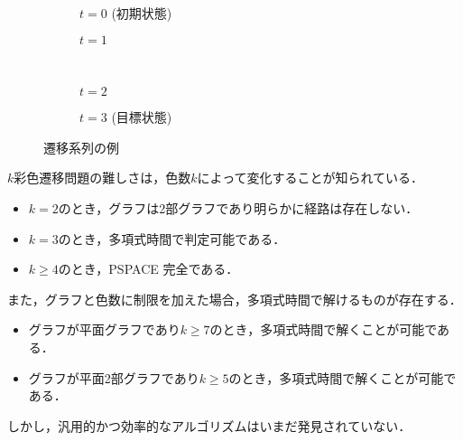 \begin{figure}[htbp]
  \centering
  \begin{subfigure}{0.4\hsize}
    \centering
    
    \caption{$t=0$ (初期状態)}
   \end{subfigure}
   \hspace{1cm}
   \begin{subfigure}{0.4\hsize}
    \centering
    
    \caption{$t=1$}
   \end{subfigure}
   \\
   \vspace{0.5cm}
   \begin{subfigure}{0.4\hsize}
    \centering
    
    \caption{$t=2$}
   \end{subfigure}
   \hspace{1cm}
   \begin{subfigure}{0.4\hsize}
    \centering
    
    \caption{$t=3$ (目標状態)}
   \end{subfigure}

   \caption{遷移系列の例}
   \label{fig:ans_varrecol}
\end{figure}

$k$彩色遷移問題の難しさは，色数$k$によって変化することが知られている． 
\begin{itemize}
  \item $k = 2$のとき，グラフは2部グラフであり明らかに経路は存在しない． \cite{CHM2011:JGT}
  \item $k = 3$のとき，多項式時間で判定可能である． \cite{CHM2011:JGT}
  \item $k \geq 4$のとき，PSPACE 完全である． \cite{BC2009:tcs}
\end{itemize}
また，グラフと色数に制限を加えた場合，多項式時間で解けるものが存在する． \cite{BC2009:tcs}
\begin{itemize}
  \item グラフが平面グラフであり$k \geq 7$のとき，多項式時間で解くことが可能である．
  \item グラフが平面2部グラフであり$k \geq 5$のとき，多項式時間で解くことが可能である．
\end{itemize}
しかし，汎用的かつ効率的なアルゴリズムはいまだ発見されていない．

